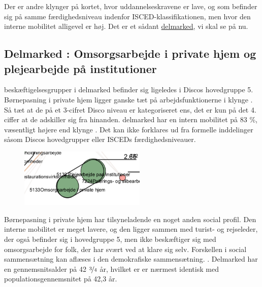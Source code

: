 Der er andre klynger på kortet, hvor uddannelseskravene er lave, og som befinder sig på samme færdighedsniveau indenfor ISCED-klassifikationen, men hvor den interne mobilitet alligevel er høj. Det er et sådant \underline{delmarked}, vi skal se på nu.


\subsection{Delmarked : Omsorgsarbejde i private hjem og plejearbejde på institutioner}

beskæftigelsesgrupper i delmarked  befinder sig ligeledes i Discos hovedgruppe 5. Børnepasning i private hjem ligger ganske tæt på arbejdsfunktionerne i klynge . Så tæt at de på et 3-cifret Disco niveau er kategoriseret ens, det er kun på det 4. ciffer at de adskiller sig fra hinanden. delmarked  har en intern mobilitet på 83 \%, væsentligt højere end klynge . Det kan ikke forklares ud fra formelle inddelinger såsom Discos hovedgrupper eller ISCEDs færdighedsniveauer.

%
\begin{figure}
  \vspace{-20pt}
  \begin{center}
    \includegraphics[width=6cm]{fig/segzoom/seg_2_66_internmob.pdf}
   \caption{}
   \label{fig_delanalyse1_zoom_2_66}
  \end{center}
  \vspace{-20pt}
\end{figure}
%

Børnepasning i private hjem har tilsyneladende en noget anden social profil. Den interne mobilitet er meget lavere, og den ligger sammen med turist- og rejseleder, der også befinder sig i hovedgruppe 5, men ikke beskæftiger sig med omsorgsarbejde for folk, der har svært ved at klare sig selv. Forskellen i social sammensætning kan aflæses i den demokrafiske sammensætning. 
%
. Delmarked  har en gennemsnitsalder på 42 $\nicefrac{3}{4}$ år, hvilket er er nærmest identisk med populationsgennemsnitet på 42,3 år. %



